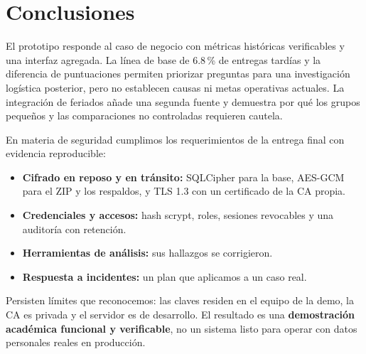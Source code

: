 \documentclass[12pt,a4paper]{article}
\begin{document}
\section{Conclusiones}
El prototipo responde al caso de negocio con métricas históricas verificables y una interfaz agregada. La línea de base de 6.8\,\% de entregas tardías y la diferencia de puntuaciones permiten priorizar preguntas para una investigación logística posterior, pero no establecen causas ni metas operativas actuales. La integración de feriados añade una segunda fuente y demuestra por qué los grupos pequeños y las comparaciones no controladas requieren cautela.

En materia de seguridad cumplimos los requerimientos de la entrega final con evidencia reproducible:
\begin{itemize}
\item \textbf{Cifrado en reposo y en tránsito:} SQLCipher para la base, AES-GCM para el ZIP y los respaldos, y TLS 1.3 con un certificado de la CA propia.
\item \textbf{Credenciales y accesos:} hash scrypt, roles, sesiones revocables y una auditoría con retención.
\item \textbf{Herramientas de análisis:} sus hallazgos se corrigieron.
\item \textbf{Respuesta a incidentes:} un plan que aplicamos a un caso real.
\end{itemize}
Persisten límites que reconocemos: las claves residen en el equipo de la demo, la CA es privada y el servidor es de desarrollo. El resultado es una \textbf{demostración académica funcional y verificable}, no un sistema listo para operar con datos personales reales en producción.
\end{document}

